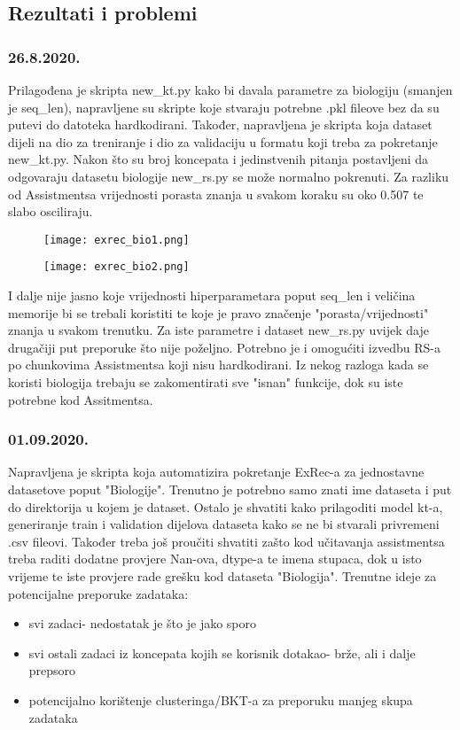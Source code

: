 \subsection{Rezultati i problemi}
 	\subsubsection{26.8.2020.}
 		Prilagođena je skripta new\_kt.py kako bi davala parametre za biologiju (smanjen je seq\_len), napravljene su skripte koje stvaraju potrebne .pkl fileove bez da su putevi do datoteka hardkodirani. Također, napravljena je skripta koja dataset dijeli na dio za treniranje i dio za validaciju u formatu koji treba za pokretanje new\_kt.py. Nakon što su broj koncepata i jedinstvenih pitanja postavljeni da odgovaraju datasetu biologije new\_rs.py se može normalno pokrenuti.
\newline
Za razliku od Assistmentsa vrijednosti porasta znanja u svakom koraku su oko 0.507 te slabo osciliraju.
 		\begin{figure}[!htb]
 			\centering
 			\texttt{[image: exrec\_bio1.png]}
 			\caption{}
 			\label{}
 		\end{figure}
 	
 	\begin{figure}[!htb]
 		\centering
 		\texttt{[image: exrec\_bio2.png]}
 		\caption{}
 		\label{}
 	\end{figure}
 
 	I dalje nije jasno koje vrijednosti hiperparametara poput seq\_len i veličina memorije bi se trebali koristiti te koje je pravo značenje "porasta/vrijednosti" znanja u svakom trenutku. Za iste parametre i dataset new\_rs.py uvijek daje drugačiji put preporuke što nije poželjno. Potrebno je i omogućiti izvedbu RS-a po chunkovima Assistmentsa koji nisu hardkodirani. Iz nekog razloga kada se koristi biologija trebaju se zakomentirati sve "isnan" funkcije, dok su iste potrebne kod Assitmentsa.
	
	\subsubsection{01.09.2020.}
		Napravljena je skripta koja automatizira pokretanje ExRec-a za jednostavne datasetove poput "Biologije". Trenutno je potrebno samo znati ime dataseta i put do direktorija u kojem je dataset. Ostalo je shvatiti kako prilagoditi model kt-a, generiranje train i validation dijelova dataseta kako se ne bi stvarali privremeni .csv fileovi. Također treba još proučiti shvatiti zašto kod učitavanja assistmentsa treba raditi dodatne provjere Nan-ova, dtype-a te imena stupaca, dok u isto vrijeme te iste provjere rade grešku kod dataseta "Biologija".
		Trenutne ideje za potencijalne preporuke zadataka:
		\begin{itemize}
			\item svi zadaci- nedostatak je što je jako sporo
			\item svi ostali zadaci iz koncepata kojih se korisnik dotakao- brže, ali i dalje prepsoro
			\item potencijalno korištenje clusteringa/BKT-a za preporuku manjeg skupa zadataka
		\end{itemize}

